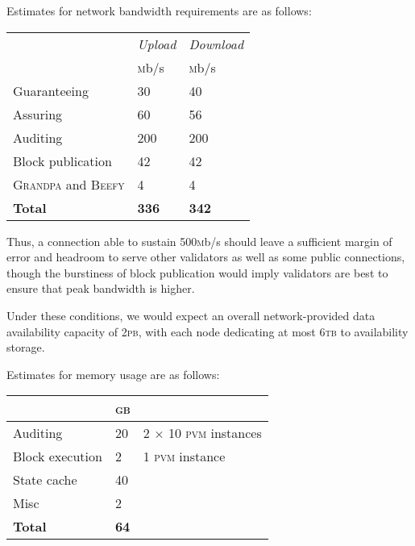 Estimates for network bandwidth requirements are as follows:
\begin{center}
\begin{tabular}[h]{@{}lll@{}}
  \toprule
  & \emph{Upload} & \emph{Download} \\
  & \textsc{m}b/s & \textsc{m}b/s \\
  \midrule
  Guaranteeing & 30 & 40 \\
  Assuring & 60 & 56 \\
  Auditing & 200 & 200 \\
  Block publication & 42 & 42 \\
  \textsc{Grandpa} and \textsc{Beefy} & 4 & 4 \\
  \textbf{Total} & \textbf{336} & \textbf{342} \\
  \bottomrule
\end{tabular}
\end{center}

Thus, a connection able to sustain 500\textsc{m}b/s should leave a sufficient margin of error and headroom to serve other validators as well as some public connections, though the burstiness of block publication would imply validators are best to ensure that peak bandwidth is higher.

Under these conditions, we would expect an overall network-provided data availability capacity of 2\textsc{pb}, with each node dedicating at most $6$\textsc{tb} to availability storage.

Estimates for memory usage are as follows:

\begin{center}
  \begin{tabular}[h]{@{}lll@{}}
    \toprule
    & \textsc{gb} \\
    \midrule
    Auditing & 20 & 2 $\times$ 10 \textsc{pvm} instances \\
    Block execution & 2 & 1 \textsc{pvm} instance \\
    State cache & 40 & \\
    Misc & 2 & \\
    \textbf{Total} & \textbf{64} & \\
    \bottomrule
  \end{tabular}
\end{center}

